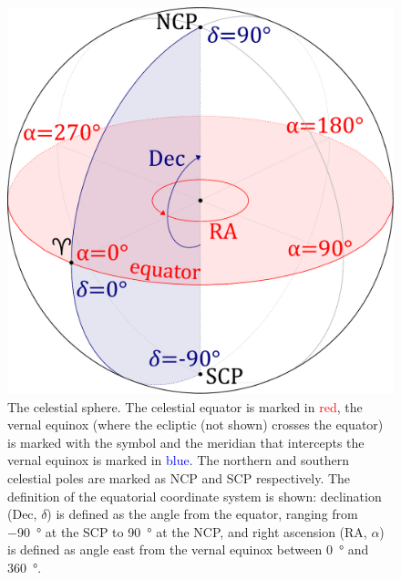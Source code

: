 \begin{colsection}
\begin{colsection}

\begin{figure}[p]
    \begin{center}
        \includegraphics[width=\linewidth]{images/globe1.pdf}
    \end{center}
    \caption[The celestial sphere]{
        The celestial sphere. The celestial equator is marked in \textcolor{red}{red}, the vernal equinox (where the ecliptic (not shown) crosses the equator) is marked with the symbol \Aries{} and the meridian that intercepts the vernal equinox is marked in \textcolor{blue}{blue}. The northern and southern celestial poles are marked as NCP and SCP respectively. The definition of the equatorial coordinate system is shown: declination (Dec, $\delta$) is defined as the angle from the equator, ranging from \SI{-90}{\degree} at the SCP to \SI{90}{\degree} at the NCP, and right ascension (RA, $\alpha$) is defined as angle east from the vernal equinox between \SI{0}{\degree} and \SI{360}{\degree}.
    }\label{fig:sphere}
\end{figure}


\end{colsection}
\end{colsection}

